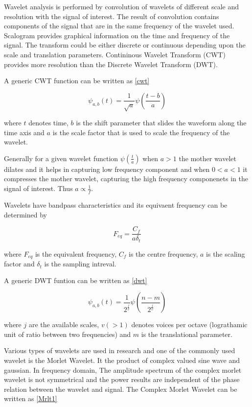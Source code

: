 Wavelet analysis is performed by convolution of wavelets of different scale and resolution with the signal of interest. The result of convolution  contains components of the signal
that are in the same frequency of the wavelet used. Scalogram provides graphical information on the time and frequency of the signal. The transform could be either 
discrete or continuous depending upon the scale and translation parameters. Contininous Wavelet Transform (CWT) provides more resolution than the Discrete Wavelet Transform (DWT).

A generic CWT function can be written as \ref{cwt}

\begin{equation} \label{eq:cwt}
    \psi_{a,b}(t) = \frac{1}{\sqrt{a}} \psi( \frac{t - b}{a}) 
\end{equation}

where $t$ denotes time, $b$ is the shift parameter that slides the waveform along the time axis and $a$ is the scale factor that is used to scale the frequency of the wavelet.

Generally for a given wavelet function $\psi(\frac{t}{a})$ when $a > 1$ the mother wavelet dilates and it helps in capturing low frequency component and when $0 < a < 1$ it 
compresses the mother wavelet, capturing the high frequency componenets in the signal of interest. Thus $a \propto \frac{1}{f}$.

Wavelets have bandpass characteristics and its equivaent frequency can be determined by 

\begin{equation} \label{eq:wt_cf}
    F_{eq} = \frac{C_f}{a\delta_t}
\end{equation}

where $F_{eq}$ is the equivalent frequency, $C_f$ is the centre frequency, $a$ is the scaling factor and $\delta_t$ is the sampling intreval.

A generic DWT funtion can be written as \ref{dwt}

\begin{equation} \label{eq:dwt}
    \psi_{a,b}(t) = \frac{1}{2^{\frac{j}{v}}} \psi( \frac{n - m}{2^{\frac{j}{v}}}) 
\end{equation}

where $j$ are the available scales, $v  (>1)$ denotes voices per octave (lograthamic unit of ratio between two frequencies) and $m$ is the translational parameter.



Various types of wavelets are used in research and one of the commonly used wavelet is the Morlet Wavelet. It the product of complex valued sine wave and gaussian.
In frequency domain,  The amplitude spectrum of the complex morlet wavelet is not symmetrical and the power results are independent of the phase relation between 
the wavelet and signal.
The Complex Morlet Wavelet can be written as \ref{Mrlt1}

